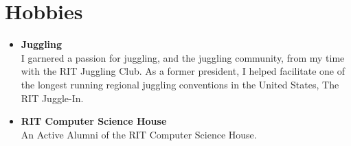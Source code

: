 \documentclass[10pt]{Article}
\begin{document}
\section*{Hobbies}
\begin{itemize}[topsep=1ex, itemsep=.5ex, parsep=0ex, partopsep=.75ex]
	\item[]{\bf Juggling}\\
	I garnered a passion for juggling, and the juggling community, from my time with the RIT Juggling Club. As a former president, I helped facilitate one of the longest running regional juggling conventions in the United States, The RIT Juggle-In.

	\item[]{\bf RIT Computer Science House}\\
	An Active Alumni of the RIT Computer Science House.
\end{itemize}
\end{document}

